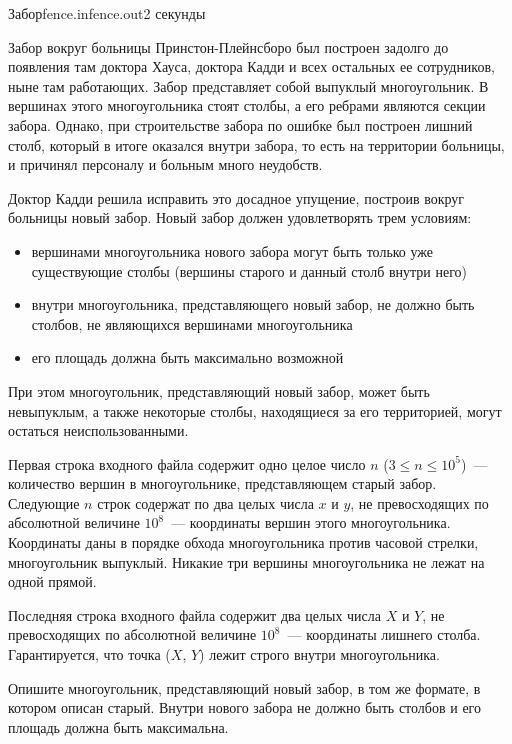 \begin{problem}{Забор}{fence.in}{fence.out}{2 секунды}


Забор вокруг больницы Принстон-Плейнсборо был построен задолго до появления там доктора Хауса, доктора Кадди и всех остальных ее сотрудников, 
ныне там работающих. Забор представляет собой выпуклый многоугольник. В вершинах этого многоугольника стоят столбы, а его ребрами являются секции 
забора. Однако, при строительстве забора по ошибке был построен лишний столб, который в итоге оказался внутри забора, то есть на территории больницы, 
и причинял персоналу и больным много неудобств.

Доктор Кадди решила исправить это досадное упущение, построив вокруг больницы новый забор. Новый забор должен удовлетворять трем условиям:

\begin{itemize}
\item вершинами многоугольника нового забора могут быть только уже существующие столбы (вершины старого и данный столб внутри него)
\item внутри многоугольника, представляющего новый забор, не должно быть столбов, не являющихся вершинами многоугольника
\item его площадь должна быть максимально возможной
\end{itemize}

При этом многоугольник, представляющий новый забор, может быть невыпуклым, а также некоторые столбы, находящиеся за его территорией, могут остаться 
неиспользованными.

\InputFile
Первая строка входного файла содержит одно целое число $n$ ($3 \le n \le 10^5$)~--- количество вершин в многоугольнике, представляющем старый забор. 
Следующие $n$ строк содержат по два целых числа $x$ и $y$, не превосходящих по абсолютной величине $10^8$~--- координаты вершин этого многоугольника. 
Координаты даны в порядке обхода многоугольника против часовой стрелки, многоугольник выпуклый. Никакие три вершины многоугольника не лежат на одной прямой.

Последняя строка входного файла содержит два целых числа $X$ и $Y$, не превосходящих по абсолютной величине $10^8$~--- координаты лишнего столба. 
Гарантируется, что точка ($X$, $Y$) лежит строго внутри многоугольника.

\OutputFile               
Опишите многоугольник, представляющий новый забор, в том же формате, в котором описан старый. Внутри нового забора не должно быть столбов и его 
площадь должна быть максимальна.

\Examples
\begin{example}%
%
\end{example}
\end{problem}
